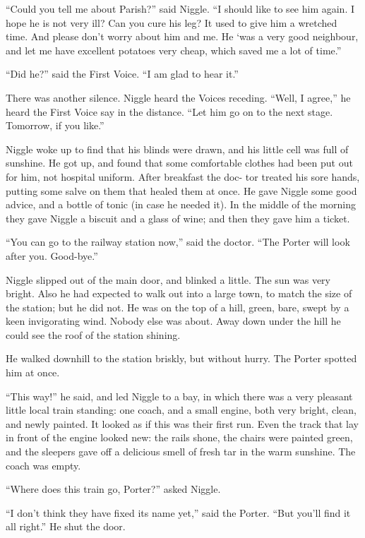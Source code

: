 \documentclass[english]{scrartcl}
\begin{document}
“Could you tell me about Parish?” said Niggle. “I should like to see him again. I hope he is not very ill? Can you cure his leg? It used to give him a wretched time. And please don’t worry about him and me. He ‘was a very good neighbour, and let me have excellent potatoes very cheap, which saved me a lot of time.”

“Did he?” said the First Voice. “I am glad to hear it.”

There was another silence. Niggle heard the Voices receding. “Well, I agree,” he heard the First Voice say in the distance. “Let him go on to the next stage. Tomorrow, if you like.”

Niggle woke up to find that his blinds were drawn, and his little cell was full of sunshine. He got up, and found that some comfortable clothes had been put out for him, not hospital uniform. After breakfast the doc- tor treated his sore hands, putting some salve on them that healed them at once. He gave Niggle some good advice, and a bottle of tonic (in case he needed it). In the middle of the morning they gave Niggle a biscuit and a glass of wine; and then they gave him a ticket.

“You can go to the railway station now,” said the doctor. “The Porter will look after you. Good-bye.”

Niggle slipped out of the main door, and blinked a little. The sun was very bright. Also he had expected to walk out into a large town, to match the size of the station; but he did not. He was on the top of a hill, green, bare, swept by a keen invigorating wind. Nobody else was about. Away down under the hill he could see the roof of the station shining.

He walked downhill to the station briskly, but without hurry. The Porter spotted him at once.

“This way!” he said, and led Niggle to a bay, in which there was a very pleasant little local train standing: one coach, and a small engine, both very bright, clean, and newly painted. It looked as if this was their first run. Even the track that lay in front of the engine looked new: the rails shone, the chairs were painted green, and the sleepers gave off a delicious smell of fresh tar in the warm sunshine. The coach was empty.

“Where does this train go, Porter?” asked Niggle.

“I don’t think they have fixed its name yet,” said the Porter. “But you’ll find it all right.” He shut the door.
\end{document}
